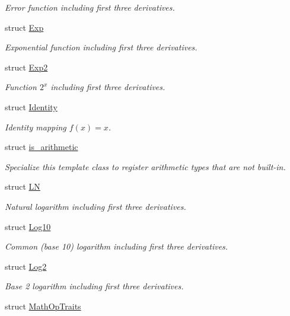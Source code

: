 \begin{DoxyCompactItemize}
\begin{DoxyCompactList}\small\item\em Error function including first three derivatives. \end{DoxyCompactList}\item 
struct \hyperlink{structFunG_1_1Exp}{Exp}
\begin{DoxyCompactList}\small\item\em Exponential function including first three derivatives. \end{DoxyCompactList}\item 
struct \hyperlink{structFunG_1_1Exp2}{Exp2}
\begin{DoxyCompactList}\small\item\em Function $2^x$ including first three derivatives. \end{DoxyCompactList}\item 
struct \hyperlink{structFunG_1_1Identity}{Identity}
\begin{DoxyCompactList}\small\item\em Identity mapping $ f(x)=x $. \end{DoxyCompactList}\item 
struct \hyperlink{structFunG_1_1is__arithmetic}{is\+\_\+arithmetic}
\begin{DoxyCompactList}\small\item\em Specialize this template class to register arithmetic types that are not built-\/in. \end{DoxyCompactList}\item 
struct \hyperlink{structFunG_1_1LN}{LN}
\begin{DoxyCompactList}\small\item\em Natural logarithm including first three derivatives. \end{DoxyCompactList}\item 
struct \hyperlink{structFunG_1_1Log10}{Log10}
\begin{DoxyCompactList}\small\item\em Common (base 10) logarithm including first three derivatives. \end{DoxyCompactList}\item 
struct \hyperlink{structFunG_1_1Log2}{Log2}
\begin{DoxyCompactList}\small\item\em Base 2 logarithm including first three derivatives. \end{DoxyCompactList}\item 
struct \hyperlink{structFunG_1_1MathOpTraits}{Math\+Op\+Traits}

\end{DoxyCompactItemize}

